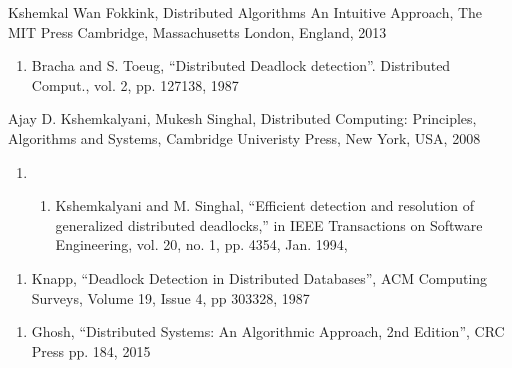 \documentclass[letterpaper,10pt,english]{sphinxmanual}
\begin{document}
\begin{sphinxthebibliography}{Kshemkal}
\sphinxAtStartPar
Wan Fokkink, Distributed Algorithms An Intuitive Approach, The MIT Press Cambridge, Massachusetts London, England, 2013
\begin{enumerate}
%
\setcounter{enumi}{6}
\item {} 
\sphinxAtStartPar
Bracha and S. Toeug, “Distributed Deadlock detection”. Distributed Comput., vol. 2, pp. 127\sphinxhyphen{}138, 1987

\end{enumerate}
\sphinxAtStartPar
Ajay D. Kshemkalyani, Mukesh Singhal, Distributed Computing: Principles, Algorithms and Systems, Cambridge Univeristy Press, New York, USA, 2008
\begin{enumerate}
%
\item {} \begin{enumerate}
%
\setcounter{enumii}{3}
\item {} 
\sphinxAtStartPar
Kshemkalyani and M. Singhal, “Efficient detection and resolution of generalized distributed deadlocks,” in IEEE Transactions on Software Engineering, vol. 20, no. 1, pp. 43\sphinxhyphen{}54, Jan. 1994,

\end{enumerate}

\end{enumerate}
\begin{enumerate}
%
\setcounter{enumi}{4}
\item {} 
\sphinxAtStartPar
Knapp, “Deadlock Detection in Distributed Databases”, ACM Computing Surveys, Volume 19, Issue 4, pp 303\sphinxhyphen{}328, 1987

\end{enumerate}
\begin{enumerate}
%
\setcounter{enumi}{18}
\item {} 
\sphinxAtStartPar
Ghosh, “Distributed Systems: An Algorithmic Approach, 2nd Edition”, CRC Press pp. 184, 2015

\end{enumerate}
\end{sphinxthebibliography}


\renewcommand{\indexname}{Python Module Index}
\begin{sphinxtheindex}
\let\bigletter\sphinxstyleindexlettergroup
\bigletter{b}
\item\relax{}
\end{sphinxtheindex}

\renewcommand{\indexname}{Index}
\printindex
\end{document}
